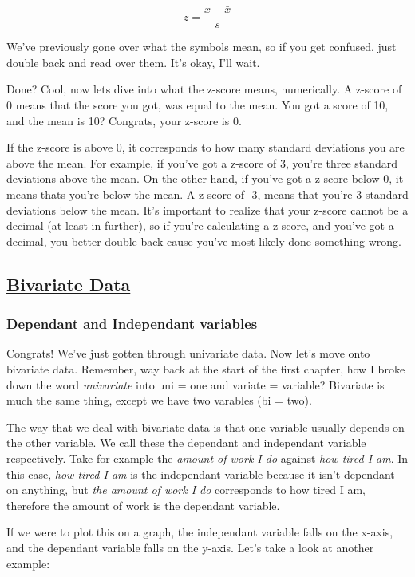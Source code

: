 \documentclass[11pt]{article}
\begin{document}
\begin{displaymath}
z = \frac{x - \bar{x}}{s}
\end{displaymath}

We've previously gone over what the symbols mean, so if you get confused, just double back and read over them. It's okay, I'll wait.

Done? Cool, now lets dive into what the z-score means, numerically. A z-score of 0 means that the score you got, was equal to the mean. You got a score of 10, and the mean is 10? Congrats, your z-score is 0.

If the z-score is above 0, it corresponds to how many standard deviations you are above the mean. For example, if you've got a z-score of 3, you're three standard deviations above the mean. On the other hand, if you've got a z-score below 0, it means thats you're below the mean. A z-score of -3, means that you're 3 standard deviations below the mean. It's important to realize that your z-score cannot be a decimal (at least in further), so if you're calculating a z-score, and you've got a decimal, you better double back cause you've most likely done something wrong.

\subsection*{\underline{Bivariate Data}}

\subsubsection*{Dependant and Independant variables}

Congrats! We've just gotten through univariate data. Now let's move onto bivariate data. Remember, way back at the start of the first chapter, how I broke down the word \emph{univariate} into uni = one and variate = variable?
Bivariate is much the same thing, except we have two varables (bi = two). 

The way that we deal with bivariate data is that one variable usually depends on the other variable. We call these the dependant and independant variable respectively. Take for example the \emph{amount of work I do} against \emph{how tired I am}. In this case, \emph{how tired I am} is the independant variable because it isn't dependant on anything, but \emph{the amount of work I do} corresponds to how tired I am, therefore the amount of work is the dependant variable.

If we were to plot this on a graph, the independant variable falls on the x-axis, and the dependant variable falls on the y-axis. Let's take a look at another example:
\end{document}
